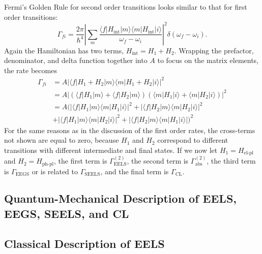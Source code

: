 \documentclass [11pt, proquest] {uwthesis}[2016/11/22]
\begin{document}
Fermi's Golden Rule for second order transitions looks similar to that for first order transitions:
\begin{equation}
\Gamma_{fi} = \frac{2\pi}{\hbar^4}\left|\sum_{m}\frac{\langle f |H_{\textrm{int}}| m \rangle \langle m |H_{\textrm{int}}| i \rangle }{\omega_f-\omega_i}\right|^2 \delta(\omega_f - \omega_i).
\label{FGR_2}
\end{equation}
Again the Hamiltonian has two terms, $H_{\textrm{int}} = H_1 + H_2$. Wrapping the prefactor, denominator, and delta function together into $A$ to focus on the matrix elements, the rate becomes
\begin{equation}
\begin{aligned}
\Gamma_{fi} &= A|\langle f |H_1 + H_2| m \rangle \langle m |H_1 + H_2| i \rangle|^2\\
&= A|(\langle f |H_1| m \rangle + \langle f |H_2| m \rangle) (\langle m |H_1| i \rangle + \langle m |H_2| i \rangle)|^2\\
&= A(|\langle f |H_1| m \rangle \langle m |H_1| i \rangle|^2 + |\langle f |H_2| m \rangle \langle m |H_2| i \rangle|^2\\
&+ |\langle f |H_1| m \rangle \langle m |H_2| i \rangle|^2 + |\langle f |H_2| m \rangle \langle m |H_1| i \rangle|)^2
\label{FGR_2_2}
\end{aligned}
\end{equation}
For the same reasons as in the discussion of the first order rates, the cross-terms not shown are equal to zero, because $H_1$ and $H_2$ correspond to different transitions with different intermediate and final states. If we now let $H_1 = H_\textrm{el-pl}$ and $H_2 = H_{\textrm{ph-pl}}$, the first term is $\Gamma_{\textrm{EELS}}^{(2)}$, the second term is $\Gamma_{\textrm{abs}}^{(2)}$, the third term is $\Gamma_{\textrm{EEGS}}$ or is related to $\Gamma_{\textrm{SEELS}}$, and the final term is $\Gamma_{\textrm{CL}}$.

\subsection{Quantum-Mechanical Description of EELS, EEGS, SEELS, and CL}

\subsection{Classical Description of EELS}

%
%
\nocite{*}   %


%
%
\appendix
\raggedbottom\sloppy
 
\end{document}
